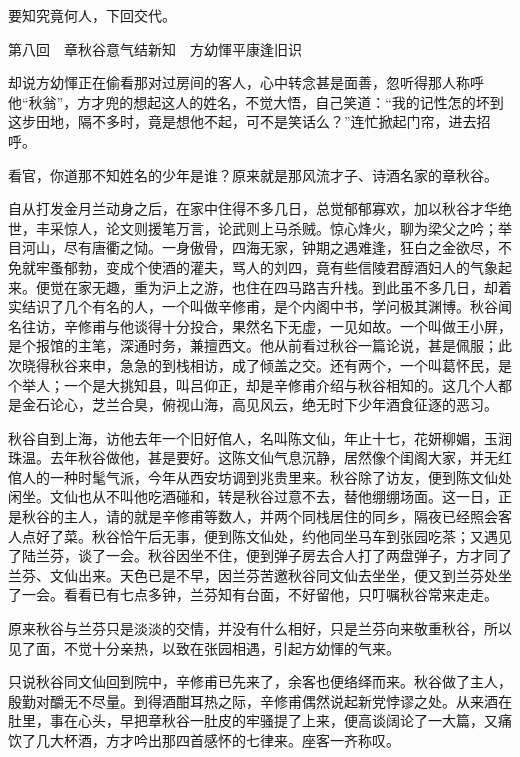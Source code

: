 \documentclass[12pt,UTF8]{ctexbook}
\begin{document}
{{{要知究竟何人，下回交代。





第八回　章秋谷意气结新知　方幼惲平康逢旧识





却说方幼惲正在偷看那对过房间的客人，心中转念甚是面善，忽听得那人称呼他“秋翁”，方才兜的想起这人的姓名，不觉大悟，自己笑道：“我的记性怎的坏到这步田地，隔不多时，竟是想他不起，可不是笑话么？”连忙掀起门帘，进去招呼。

看官，你道那不知姓名的少年是谁？原来就是那风流才子、诗酒名家的章秋谷。

自从打发金月兰动身之后，在家中住得不多几日，总觉郁郁寡欢，加以秋谷才华绝世，丰采惊人，论文则援笔万言，论武则上马杀贼。惊心烽火，聊为梁父之吟；举目河山，尽有唐衢之恸。一身傲骨，四海无家，钟期之遇难逢，狂白之金欲尽，不免就牢蚤郁勃，变成个使酒的灌夫，骂人的刘四，竟有些信陵君醇酒妇人的气象起来。便觉在家无趣，重为沪上之游，也住在四马路吉升栈。到此虽不多几日，却着实结识了几个有名的人，一个叫做辛修甫，是个内阁中书，学问极其渊博。秋谷闻名往访，辛修甫与他谈得十分投合，果然名下无虚，一见如故。一个叫做王小屏，是个报馆的主笔，深通时务，兼擅西文。他从前看过秋谷一篇论说，甚是佩服；此次晓得秋谷来申，急急的到栈相访，成了倾盖之交。还有两个，一个叫葛怀民，是个举人；一个是大挑知县，叫吕仰正，却是辛修甫介绍与秋谷相知的。这几个人都是金石论心，芝兰合臭，俯视山海，高见风云，绝无时下少年酒食征逐的恶习。

秋谷自到上海，访他去年一个旧好倌人，名叫陈文仙，年止十七，花妍柳媚，玉润珠温。去年秋谷做他，甚是要好。这陈文仙气息沉静，居然像个闺阁大家，并无红倌人的一种时髦气派，今年从西安坊调到兆贵里来。秋谷除了访友，便到陈文仙处闲坐。文仙也从不叫他吃酒碰和，转是秋谷过意不去，替他绷绷场面。这一日，正是秋谷的主人，请的就是辛修甫等数人，并两个同栈居住的同乡，隔夜已经照会客人点好了菜。秋谷恰午后无事，便到陈文仙处，约他同坐马车到张园吃茶；又遇见了陆兰芬，谈了一会。秋谷因坐不住，便到弹子房去合人打了两盘弹子，方才同了兰芬、文仙出来。天色已是不早，因兰芬苦邀秋谷同文仙去坐坐，便又到兰芬处坐了一会。看看已有七点多钟，兰芬知有台面，不好留他，只叮嘱秋谷常来走走。

原来秋谷与兰芬只是淡淡的交情，并没有什么相好，只是兰芬向来敬重秋谷，所以见了面，不觉十分亲热，以致在张园相遇，引起方幼惲的气来。

只说秋谷同文仙回到院中，辛修甫已先来了，余客也便络绎而来。秋谷做了主人，殷勤对釂无不尽量。到得酒酣耳热之际，辛修甫偶然说起新党悖谬之处。从来酒在肚里，事在心头，早把章秋谷一肚皮的牢骚提了上来，便高谈阔论了一大篇，又痛饮了几大杯酒，方才吟出那四首感怀的七律来。座客一齐称叹。

}}}
\end{document}
